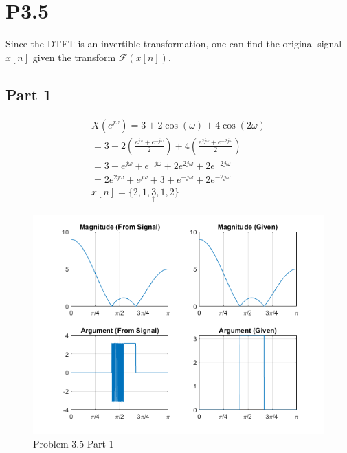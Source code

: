 \documentclass{article}
\begin{document}
\section*{P3.5}
Since the DTFT is an invertible transformation, one can find the original signal \(x[n]\) given the transform \(\mathcal{F}(x[n])\).
\subsection*{Part 1}
\begin{gather*}
    X\left(e^{j\omega}\right) = 3 + 2\cos(\omega) + 4\cos(2\omega)\\
    = 3 + 2\left(\frac{e^{j\omega} + e^{-j\omega}}{2}\right) + 4\left(\frac{e^{2j\omega} + e^{-2j\omega}}{2}\right)\\
    = 3 + e^{j\omega} + e^{-j\omega} + 2e^{2j\omega} + 2e^{-2j\omega}\\
    = 2e^{2j\omega} + e^{j\omega} + 3 + e^{-j\omega} + 2e^{-2j\omega}\\
    x[n] = \{2, 1, \underset{\uparrow}{3}, 1, 2\}
\end{gather*}
\begin{figure}[H]
    \centering
    \includegraphics[width=\textwidth]{html/Homework3_13.png}
    \caption{Problem 3.5 Part 1}
    \label{3.5.1}
\end{figure}
\end{document}
